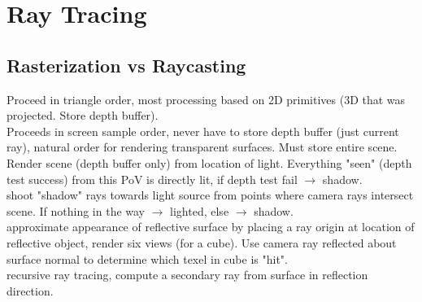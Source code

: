\section{Ray Tracing}
\subsection*{Rasterization vs Raycasting}
 Proceed in triangle order, most processing based on 2D primitives (3D that was projected. Store depth buffer).\\
 Proceeds in screen sample order, never have to store depth buffer (just current ray), natural order for rendering transparent surfaces. Must store entire scene.\\
 Render scene (depth buffer only) from location of light. Everything "seen" (depth test success) from this PoV is directly lit, if depth test fail $\rightarrow$ shadow.\\
 shoot "shadow" rays towards light source from points where camera rays intersect scene. If nothing in the way $\rightarrow$ lighted, else $\rightarrow$ shadow.\\
 approximate appearance of reflective surface by placing a ray origin at location of reflective object, render six views (for a cube). Use camera ray reflected about surface normal to determine which texel in cube is "hit".\\
 recursive ray tracing, compute a secondary ray from surface in reflection direction.

